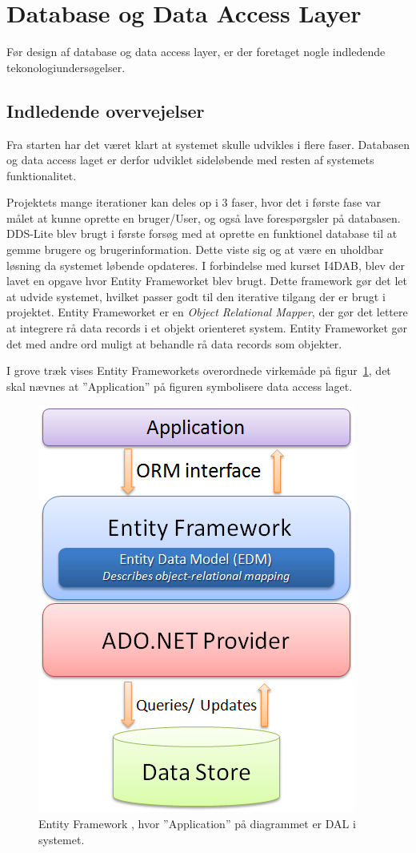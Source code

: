 \section{Database og Data Access Layer}\label{sec:designdatabase}

Før design af database og data access layer, er der foretaget nogle indledende tekonologiundersøgelser.

\subsection{Indledende overvejelser}
Fra starten har det været klart at systemet skulle udvikles i flere faser. Databasen og data access laget er derfor udviklet sideløbende med resten af systemets funktionalitet.

Projektets mange iterationer kan deles op i 3 faser, hvor det i første fase var målet at kunne oprette en bruger/User, og også lave forespørgsler på databasen.
DDS-Lite blev brugt i første forsøg med at oprette en funktionel database til at gemme brugere og brugerinformation. Dette viste sig og at være en uholdbar løsning da systemet løbende opdateres. I forbindelse med kurset I4DAB, blev der lavet en opgave hvor Entity Frameworket blev brugt. Dette framework gør det let at udvide systemet, hvilket passer godt til den iterative tilgang der er brugt i projektet. Entity Frameworket er en \textit{Object Relational Mapper}, der gør det lettere at integrere rå data records i et objekt orienteret system. Entity Frameworket gør det med andre ord muligt at behandle rå data records som objekter.

I grove træk vises Entity Frameworkets overordnede virkemåde på figur~\ref{fig:EFarch}, det skal nævnes at ''Application'' på figuren symbolisere data access laget.

\begin{figure}[h]
\centering
\includegraphics[width=0.5\linewidth]{figs/dbExtra/EFarch}
\caption{Entity Framework \cite{efArch}, hvor ''Application'' på diagrammet er DAL i systemet.}
\label{fig:EFarch}
\end{figure}


